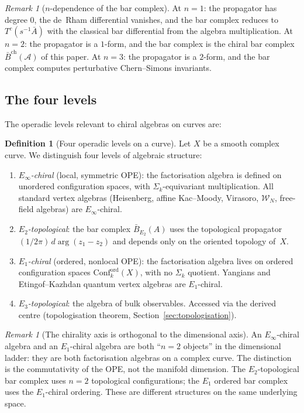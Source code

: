 \documentclass[11pt,reqno]{amsart}
\theoremstyle{definition}
\newtheorem{definition}[theorem]{Definition}
\theoremstyle{remark}
\newtheorem{remark}[theorem]{Remark}
\providecommand{\cA}{\mathcal{A}}
\providecommand{\cW}{\mathcal{W}}
\providecommand{\Conf}{\mathrm{Conf}}
\providecommand{\Eone}{E_1}
\providecommand{\Etwo}{E_2}
\providecommand{\Ethree}{E_3}
\providecommand{\Einf}{E_\infty}
\providecommand{\barB}{\bar{B}}
\begin{document}
\begin{remark}[$n$-dependence of the bar complex]
\label{rem:e-n-dependence}
At $n = 1$: the propagator has degree $0$, the de~Rham
differential vanishes, and the bar complex reduces to
$T^c(s^{-1}\bar{A})$ with the classical bar differential from
the algebra multiplication. At $n = 2$: the propagator is a
$1$-form, and the bar complex is the chiral bar complex
$\barB^{\mathrm{ch}}(\cA)$ of this paper. At $n = 3$: the
propagator is a $2$-form, and the bar complex computes
perturbative Chern--Simons invariants.
\end{remark}

\subsection{The four levels}

The operadic levels relevant to chiral algebras on curves are:

\begin{definition}[Four operadic levels on a curve]
\label{def:e-four-levels}
Let $X$ be a smooth complex curve. We distinguish four levels
of algebraic structure:
\begin{enumerate}[label=\textup{(\roman*)}]
\item \emph{$\Einf$-chiral} (local, symmetric OPE):
 the factorisation algebra is defined on unordered
 configuration spaces, with $\Sigma_k$-equivariant
 multiplication.
 All standard vertex algebras (Heisenberg, affine Kac--Moody,
 Virasoro, $\cW_N$, free-field algebras) are $\Einf$-chiral.
\item \emph{$\Etwo$-topological}: the bar complex
 $\barB_{\Etwo}(A)$ uses the topological propagator
 $(1/2\pi)\,d\arg(z_1 - z_2)$ and depends only on the
 oriented topology of~$X$.
\item \emph{$\Eone$-chiral} (ordered, nonlocal OPE):
 the factorisation algebra lives on ordered configuration
 spaces $\Conf_k^{\mathrm{ord}}(X)$, with no $\Sigma_k$
 quotient. Yangians and Etingof--Kazhdan quantum vertex
 algebras are $\Eone$-chiral.
\item \emph{$\Ethree$-topological}: the algebra of bulk
 observables. Accessed via the derived centre
 (topologisation theorem, Section~\ref{sec:topologisation}).
\end{enumerate}
\end{definition}

\begin{remark}[The chirality axis is orthogonal to the
dimensional axis]\label{rem:e-orthogonality}
An $\Einf$-chiral algebra and an $\Eone$-chiral algebra are both
``$n = 2$ objects'' in the dimensional ladder: they are both
factorisation algebras on a complex curve. The distinction is
the commutativity of the OPE, not the manifold dimension.
The $\Etwo$-topological bar complex uses $n = 2$ topological
configurations; the $\Eone$ ordered bar complex uses the
$\Eone$-chiral ordering. These are different structures on the
same underlying space.
\end{remark}
\end{document}
